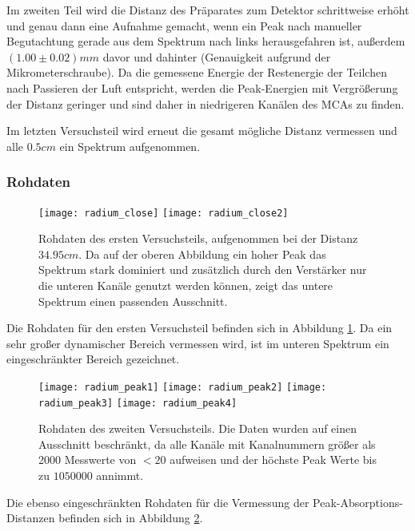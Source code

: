 \documentclass{../Misc/MontavonLaTeX/Montavon}
\newcommand{\halfwidth}{0.48\textwidth}
\newcommand{\fullwidth}{1.0\textwidth}
\begin{document}
Im zweiten Teil wird die Distanz des Präparates zum Detektor schrittweise erhöht und genau dann eine Aufnahme gemacht, wenn ein Peak nach manueller Begutachtung gerade aus dem Spektrum nach links herausgefahren ist, außerdem $(1.00 \pm 0.02) \unit{mm}$ davor und dahinter (Genauigkeit aufgrund der Mikrometerschraube). Da die gemessene Energie der Restenergie der Teilchen nach Passieren der Luft entspricht, werden die Peak-Energien mit Vergrößerung der Distanz geringer und sind daher in niedrigeren Kanälen des MCAs zu finden.

Im letzten Versuchsteil wird erneut die gesamt mögliche Distanz vermessen und alle $0.5 \unit{cm}$ ein Spektrum aufgenommen.

\subsubsection{Rohdaten}

\begin{figure}[htbp]
\centering
\texttt{[image: radium\_close]}
\texttt{[image: radium\_close2]}
\caption{Rohdaten des ersten Versuchsteils, aufgenommen bei der Distanz $34.95 \unit{cm}$. Da auf der oberen Abbildung ein hoher Peak das Spektrum stark dominiert und zusätzlich durch den Verstärker nur die unteren Kanäle genutzt werden können, zeigt das untere Spektrum einen passenden Ausschnitt.}
\label{fig:radium_close}
\end{figure}

Die Rohdaten für den ersten Versuchsteil befinden sich in Abbildung \ref{fig:radium_close}. Da ein sehr großer dynamischer Bereich vermessen wird, ist im unteren Spektrum ein eingeschränkter Bereich gezeichnet.

\begin{figure}[htbp]
\centering
\texttt{[image: radium\_peak1]}
\texttt{[image: radium\_peak2]}
\texttt{[image: radium\_peak3]}
\texttt{[image: radium\_peak4]}
\caption{Rohdaten des zweiten Versuchsteils. Die Daten wurden auf einen Ausschnitt beschränkt, da alle Kanäle mit Kanalnummern größer als 2000 Messwerte von $< 20$ aufweisen und der höchste Peak Werte bis zu $1050000$ annimmt.}
\label{fig:radium_peaks}
\end{figure}

Die ebenso eingeschränkten Rohdaten für die Vermessung der Peak-Absorptions-Distanzen befinden sich in Abbildung \ref{fig:radium_peaks}.
\end{document}
